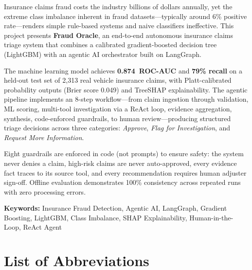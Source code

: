 \documentclass[12pt,a4paper]{article}
\begin{document}
Insurance claims fraud costs the industry billions of dollars annually, yet the extreme class imbalance inherent in fraud datasets---typically around 6\% positive rate---renders simple rule-based systems and naive classifiers ineffective.  This project presents \textbf{Fraud Oracle}, an end-to-end autonomous insurance claims triage system that combines a calibrated gradient-boosted decision tree (LightGBM) with an agentic AI orchestrator built on LangGraph.

The machine learning model achieves \textbf{0.874~ROC-AUC} and \textbf{79\% recall} on a held-out test set of 2,313 real vehicle insurance claims, with Platt-calibrated probability outputs (Brier score 0.049) and TreeSHAP explainability.  The agentic pipeline implements an 8-step workflow---from claim ingestion through validation, ML scoring, multi-tool investigation via a ReAct loop, evidence aggregation, synthesis, code-enforced guardrails, to human review---producing structured triage decisions across three categories: \textit{Approve}, \textit{Flag for Investigation}, and \textit{Request More Information}.

Eight guardrails are enforced in code (not prompts) to ensure safety: the system never denies a claim, high-risk claims are never auto-approved, every evidence fact traces to its source tool, and every recommendation requires human adjuster sign-off.  Offline evaluation demonstrates 100\% consistency across repeated runs with zero processing errors.

\textbf{Keywords:} Insurance Fraud Detection, Agentic AI, LangGraph, Gradient Boosting, LightGBM, Class Imbalance, SHAP Explainability, Human-in-the-Loop, ReAct Agent

\newpage
\tableofcontents

\newpage
\listoffigures
{}

\newpage
\listoftables
{}

\newpage
\section*{List of Abbreviations}
\end{document}
